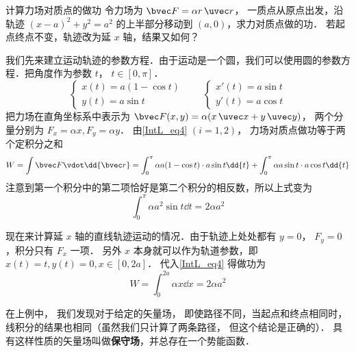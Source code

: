 \begin{example}{计算力场对质点的做功}\label{IntL_ex1}
令力场为 $\bvec F = \alpha r \,\uvec r$， 一质点从原点出发，沿轨迹 $(x-a)^2 + y^2 = a^2$ 的上半部分移动到 $(a,0)$，求力对质点做的功． 若起点终点不变，轨迹改为延 $x$ 轴，结果又如何？

我们先来建立运动轨迹的参数方程．由于运动是一个圆，我们可以使用圆的参数方程．把角度作为参数 $t$， $t\in [0,\pi]$．
\begin{equation}
\begin{cases}
x(t) = a(1-\cos t)\\
y(t) = a \sin t
\end{cases}
\qquad 
\begin{cases}
x'(t) = a \sin t\\
y'(t) = a \cos t
\end{cases}
\end{equation}
把力场在直角坐标系中表示为 $\bvec F(x,y) = \alpha (x\,\uvec x + y\,\uvec y)$， 两个分量分别为 $F_x = \alpha x, F_y = \alpha y$． 由\autoref{IntL_eq4} $(i=1,2)$， 力场对质点做功等于两个定积分之和
\begin{equation}
W = \int \bvec F \vdot \dd{\bvec r} =\int_0^\pi \alpha a(1-\cos t) \cdot a \sin t \dd{t} + \int_0^\pi \alpha a \sin t \cdot a \cos t \dd{t}
\end{equation}
注意到第一个积分中的第二项恰好是第二个积分的相反数，所以上式变为
\begin{equation}
\int_0^\pi \alpha a^2 \sin t \dd{t} =2 \alpha a^2
\end{equation}

现在来计算延 $x$ 轴的直线轨迹运动的情况．由于轨迹上处处都有 $y=0$， $F_y = 0$，积分只有 $F_x$ 一项． 另外 $x$ 本身就可以作为轨道参数，即 $x(t) = t, y(t) = 0, x\in [0, 2a]$． 代入\autoref{IntL_eq4} 得做功为
\begin{equation}
W = \int_0^{2a} \alpha x \dd{x} = 2 \alpha a^2
\end{equation}
\end{example}

在上例中， 我们发现对于给定的矢量场， 即使路径不同，当起点和终点相同时， 线积分的结果也相同（虽然我们只计算了两条路径， 但这个结论是正确的）． 具有这样性质的矢量场叫做\textbf{保守场}，并总存在一个势能函数． 
